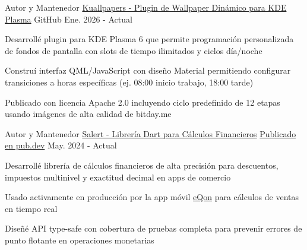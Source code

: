 
\begin{cventries}

  \cventry
    {Autor y Mantenedor} %
    {\href{https://github.com/zp1ke/kuallpapers}{Kuallpapers - Plugin de Wallpaper Dinámico para KDE Plasma}} %
    {\faGithubSquare\acvHeaderIconSep GitHub} %
    {Ene. 2026 - Actual} %
    {
      \begin{cvitems} %
        \item {Desarrollé plugin para KDE Plasma 6 que permite programación personalizada de fondos de pantalla con slots de tiempo ilimitados y ciclos día/noche}
        \item {Construí interfaz QML/JavaScript con diseño Material permitiendo configurar transiciones a horas específicas (ej. 08:00 inicio trabajo, 18:00 tarde)}
        \item {Publicado con licencia Apache 2.0 incluyendo ciclo predefinido de 12 etapas usando imágenes de alta calidad de bitday.me}
      \end{cvitems}
    }

  \cventry
    {Autor y Mantenedor} %
    {\href{https://github.com/zp1ke/salert}{Salert - Librería Dart para Cálculos Financieros}} %
    {\href{https://pub.dev/packages/salert}{Publicado en pub.dev}} %
    {May. 2024 - Actual} %
    {
      \begin{cvitems} %
        \item {Desarrollé librería de cálculos financieros de alta precisión para descuentos, impuestos multinivel y exactitud decimal en apps de comercio}
        \item {Usado activamente en producción por la app móvil {\href{https://eqon.ec/}{eQon}} para cálculos de ventas en tiempo real}
        \item {Diseñé API type-safe con cobertura de pruebas completa para prevenir errores de punto flotante en operaciones monetarias}
      \end{cvitems}
    }


\end{cventries}
